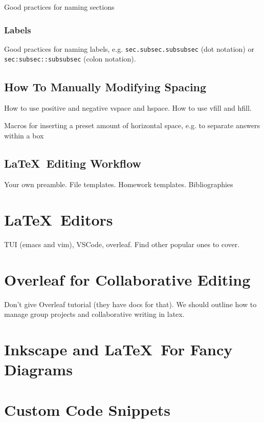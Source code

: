 \documentclass[12pt]{article}
\begin{document}
Good practices for naming sections

\subsubsection{Labels}%
\label{tips.name-convs.labels}

Good practices for naming labels, e.g. \texttt{sec.subsec.subsubsec} (dot notation) or \texttt{sec:subsec::subsubsec} (colon notation).

\subsection{How To Manually Modifying Spacing}%
\label{tips.spacing}

How to use positive and negative vspace and hspace. How to use vfill and hfill.

Macros for inserting a preset amount of horizontal space, e.g. to separate answers within a box

\subsection{\LaTeX\ Editing Workflow}%
\label{workflow}

Your own preamble. File templates. Homework templates. Bibliographies

\section{\LaTeX\ Editors}%
\label{latex-editors}

TUI (emacs and vim), VSCode, overleaf. Find other popular ones to cover.

\section{Overleaf for Collaborative Editing}%
\label{overleaf}

Don't give Overleaf tutorial (they have docs for that). We should outline how to manage group projects and collaborative writing in latex.

\section{Inkscape and \LaTeX\ For Fancy Diagrams}%
\label{inkscape-latex}

\section{Custom Code Snippets}%
\label{custom-code-snippets}
\end{document}
